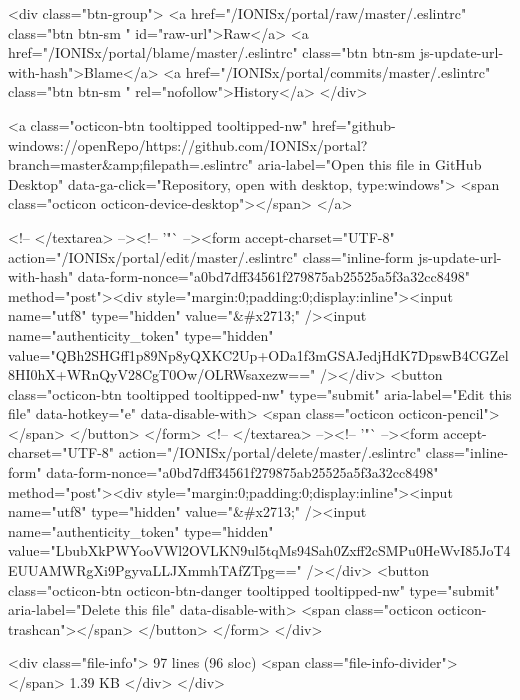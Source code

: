     <div class="btn-group">
      <a href="/IONISx/portal/raw/master/.eslintrc" class="btn btn-sm " id="raw-url">Raw</a>
        <a href="/IONISx/portal/blame/master/.eslintrc" class="btn btn-sm js-update-url-with-hash">Blame</a>
      <a href="/IONISx/portal/commits/master/.eslintrc" class="btn btn-sm " rel="nofollow">History</a>
    </div>

        <a class="octicon-btn tooltipped tooltipped-nw"
           href="github-windows://openRepo/https://github.com/IONISx/portal?branch=master&amp;filepath=.eslintrc"
           aria-label="Open this file in GitHub Desktop"
           data-ga-click="Repository, open with desktop, type:windows">
            <span class="octicon octicon-device-desktop"></span>
        </a>

        <!-- </textarea> --><!-- '"` --><form accept-charset="UTF-8" action="/IONISx/portal/edit/master/.eslintrc" class="inline-form js-update-url-with-hash" data-form-nonce="a0bd7dff34561f279875ab25525a5f3a32cc8498" method="post"><div style="margin:0;padding:0;display:inline"><input name="utf8" type="hidden" value="&#x2713;" /><input name="authenticity_token" type="hidden" value="QBh2SHGff1p89Np8yQXKC2Up+ODa1f3mGSAJedjHdK7DpswB4CGZel8HI0hX+WRnQyV28CgT0Ow/OLRWsaxezw==" /></div>
          <button class="octicon-btn tooltipped tooltipped-nw" type="submit"
            aria-label="Edit this file" data-hotkey="e" data-disable-with>
            <span class="octicon octicon-pencil"></span>
          </button>
</form>        <!-- </textarea> --><!-- '"` --><form accept-charset="UTF-8" action="/IONISx/portal/delete/master/.eslintrc" class="inline-form" data-form-nonce="a0bd7dff34561f279875ab25525a5f3a32cc8498" method="post"><div style="margin:0;padding:0;display:inline"><input name="utf8" type="hidden" value="&#x2713;" /><input name="authenticity_token" type="hidden" value="LbubXkPWYooVWl2OVLKN9ul5tqMs94Sah0Zxff2cSMPu0HeWvI85JoT4EUUAMWRgXi9PgyvaLLJXmmhTAfZTpg==" /></div>
          <button class="octicon-btn octicon-btn-danger tooltipped tooltipped-nw" type="submit"
            aria-label="Delete this file" data-disable-with>
            <span class="octicon octicon-trashcan"></span>
          </button>
</form>  </div>

  <div class="file-info">
      97 lines (96 sloc)
      <span class="file-info-divider"></span>
    1.39 KB
  </div>
</div>

  

